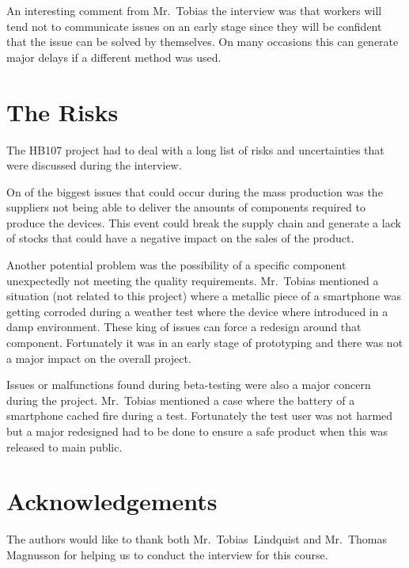 \documentclass[journal]{IEEEtran}
\begin{document}
An interesting comment from Mr.~Tobias the interview was that workers will tend not to communicate issues on an early stage since they will be confident that the issue can be solved by themselves. On many occasions this can generate major delays if a different method was used.

\section{The Risks}
The HB107 project had to deal with a long list of risks and uncertainties that were discussed during the interview.

On of the biggest issues that could occur during the mass production was the suppliers not being able to deliver the amounts of components required to produce the devices. This event could break the supply chain and generate a lack of stocks that could have a negative impact on the sales of the product.

Another potential problem was the possibility of a specific component unexpectedly not meeting the quality requirements. Mr.~Tobias mentioned a situation (not related to this project) where a metallic piece of a smartphone was getting corroded during a weather test where the device where introduced in a damp environment. These king of issues can force a redesign around that component. Fortunately it was in an early stage of prototyping and there was not a major impact on the overall project.

Issues or malfunctions found during beta-testing were also a major concern during the project. Mr.~Tobias mentioned a case where the battery of a smartphone cached fire during a test. Fortunately the test user was not harmed but a major redesigned had to be done to ensure a safe product when this was released to main public.

\section*{Acknowledgements}
The authors would like to thank both  Mr.~Tobias~Lindquist and Mr.~Thomas Magnusson for helping us to conduct the interview for this course.
\end{document}
